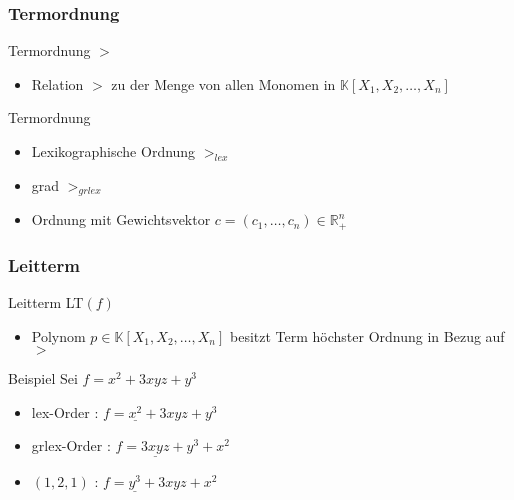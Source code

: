 \documentclass{beamer}
\begin{document}
\begin{frame}[fragile]
\frametitle{Termordnung}
\begin{block}{Termordnung $>$}
\begin{itemize}
\item Relation $>$ zu der Menge von allen Monomen in $ \mathbb{K} \left[X_{1},X_{2},\dots, X_{n}\right]  $ 
\end{itemize}



\end{block}

\begin{block}{Termordnung }
\begin{itemize}
\item Lexikographische Ordnung $>_{lex}$
\item grad $>_{grlex}$
\item Ordnung mit Gewichtsvektor $c = (c_1, \ldots , c_n ) \in \mathbb{R}^{n}_{+}$
\end{itemize}



\end{block}


\end{frame}
\begin{frame}[fragile]
\frametitle{Leitterm}

\begin{block}{Leitterm \textsc{LT}$(f)$ }
\begin{itemize}
\item Polynom $p \in  \mathbb{K} \left[X_{1},X_{2},\dots, X_{n}\right] $  besitzt Term höchster Ordnung in Bezug auf $>$
\end{itemize}

\end{block}


\begin{block}{Beispiel}
Sei $f = x^{2}+3xyz+y^{3} $
\begin{itemize}

\item lex-Order : $f = \underline{x^{2}} + 3xyz + y^{3}  $
\item grlex-Order :  $f = \underline{3xyz} + y^{3} + x^{2}  $
\item $\left(1,2,1\right)$ :  $f = \underline{y^{3}} + 3xyz + x^{2}  $
\end{itemize}

\end{block}


\end{frame}
\end{document}

